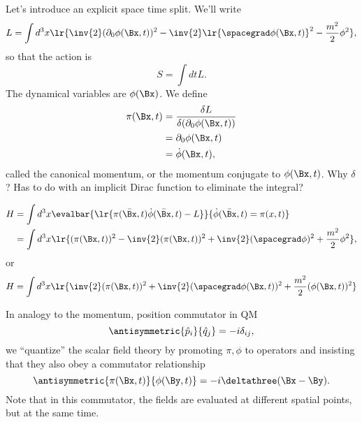 Let's introduce an explicit space time split.  We'll write
\begin{equation}\label{eqn:qftLecture4:880}
L = \int d^3 x \lr{
\inv{2} (\partial_0 \phi(\Bx, t))^2 - \inv{2} \lr{ \spacegrad \phi(\Bx, t) }^2 - \frac{m^2}{2} \phi^2
},
\end{equation}
so that the action is
\begin{equation}\label{eqn:qftLecture4:900}
S = \int dt L.
\end{equation}
The dynamical variables are \( \phi(\Bx) \).  We define
\begin{equation}\label{eqn:qftLecture4:920}
\begin{aligned}
\pi(\Bx, t)
&= \frac{\delta L}{\delta (\partial_0 \phi(\Bx, t))} \\
&= \partial_0 \phi(\Bx, t) \\
&= \dot{\phi}(\Bx, t),
\end{aligned}
\end{equation}
called the canonical momentum, or the momentum conjugate to \( \phi(\Bx, t) \).
Why \( \delta \)?  Has to do with an implicit Dirac function to eliminate the integral?

\begin{equation}\label{eqn:qftLecture4:940}
\begin{aligned}
H
&= \int d^3 x \evalbar{\lr{ \pi(\bar{\Bx}, t) \dot{\phi}(\bar{\Bx}, t) - L }}{\dot{\phi}(\bar{\Bx}, t) = \pi(x, t) } \\
&= \int d^3 x \lr{ (\pi(\Bx, t))^2 - \inv{2} (\pi(\Bx, t))^2 + \inv{2} (\spacegrad \phi)^2 + \frac{m^2}{2} \phi^2 },
\end{aligned}
\end{equation}
or
\begin{equation}\label{eqn:qftLecture4:960}
H = \int d^3 x \lr{ \inv{2} (\pi(\Bx, t))^2 + \inv{2} (\spacegrad \phi(\Bx, t))^2 + \frac{m^2}{2} (\phi(\Bx, t))^2 }
\end{equation}

In analogy to the momentum, position commutator in QM
\begin{equation}\label{eqn:qftLecture4:1000}
\antisymmetric{\hat{p}_i}{\hat{q}_j} = -i \delta_{ij},
\end{equation}
we ``quantize'' the scalar field theory by promoting \( \pi, \phi \) to operators and insisting that they also obey a commutator relationship
\begin{equation}\label{eqn:qftLecture4:980}
\antisymmetric{\pi(\Bx, t)}{\phi(\By, t)} = -i \deltathree(\Bx - \By).
\end{equation}
Note that in this commutator, the fields are evaluated at different spatial points, but at the same time.
